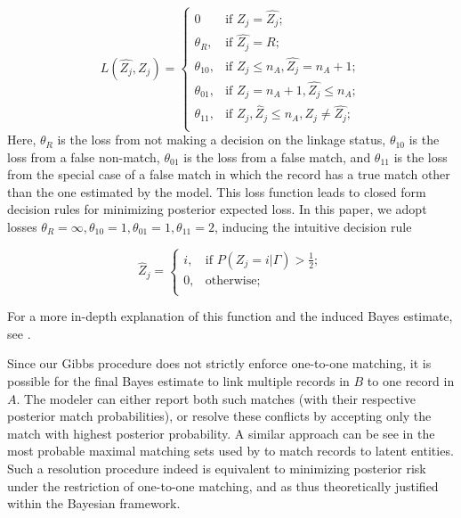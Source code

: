 \documentclass[12pt,letterpaper]{article}
\newcommand{\1}[1]{\mathbb{I}\!\left[#1\right]} %
\begin{document}
\[L(\hat{Z_j}, Z_j)=\begin{cases} 
	0  & \text{if } Z_j = \hat{Z_j}; \\
	\theta_R,  & \text{if } \hat{Z_j} = R; \\
	\theta_{10},  & \text{if } Z_j \leq n_A,\hat{Z_j} = n_A + 1 ; \\
	\theta_{01},  & \text{if } Z_j = n_A + 1,\hat{Z_j} \leq n_A ; \\
	\theta_{11},  & \text{if } Z_j, \hat{Z}_j \leq n_A, Z_j \neq \hat{Z_j} ; \\
\end{cases}\] Here, \(\theta_R\) is the loss from not making a decision
on the linkage status, \(\theta_{10}\) is the loss from a false
non-match, \(\theta_{01}\) is the loss from a false match, and
\(\theta_{11}\) is the loss from the special case of a false match in
which the record has a true match other than the one estimated by the
model. This loss function leads to closed form decision rules for
minimizing posterior expected loss. In this paper, we adopt losses
\(\theta_R = \infty, \theta_{10} = 1, \theta_{01} = 1, \theta_{11} = 2\),
inducing the intuitive decision rule

\[\hat{Z}_j =\begin{cases} 
	i,  & \text{if } P(Z_j = i |\Gamma) > \frac{1}{2}; \\
	0,  & \text{otherwise} ; \\
\end{cases}\]

For a more in-depth explanation of this function and the induced Bayes
estimate, see \citep{sadinle2017}.

Since our Gibbs procedure does not strictly enforce one-to-one matching,
it is possible for the final Bayes estimate to link multiple records in
\(B\) to one record in \(A\). The modeler can either report both such
matches (with their respective posterior match probabilities), or
resolve these conflicts by accepting only the match with highest
posterior probability. A similar approach can be see in the most probable maximal matching sets used by \citep{steorts_2013} to match records to latent entities. Such a resolution procedure indeed is equivalent
to minimizing posterior risk under the restriction of one-to-one
matching, and as thus theoretically justified within the Bayesian
framework.
\end{document}
